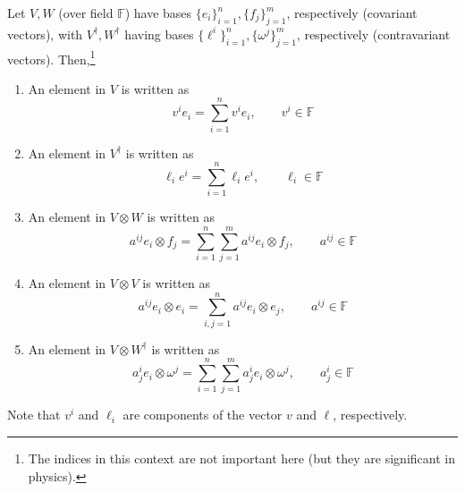	\begin{definition}
	  \label{def:einstein-summation-notation}
 
		Let $V, W$ (over field $\mathbb{F}$) have bases $\{e_i\}_{i = 1}^n, \{f_j\}_{j=1}^m$, respectively (covariant vectors), with $V^\dagger, W^\dagger$ having bases $\{\ell^i\}_{i=1}^n, \{\omega^j\}_{j=1}^m$, respectively (contravariant vectors). Then,\footnote{The indices in this context are not important here (but they are significant in physics).} 
		\begin{enumerate}
		  \item An element in $V$ is written as 
				\begin{equation}
					v^i e_i = \sum_{i=1}^n v^i e_i, \qquad v^i \in \mathbb{F}
				\end{equation}

			\item An element in $V^\dagger$ is written as 
				\begin{equation}
					\ell_i e^i = \sum_{i=1}^n \ell_i e^i, \qquad \ell_i \in \mathbb{F}
				\end{equation}

			\item An element in $V \otimes W$ is written as 
				\begin{equation}
					a^{ij} e_i \otimes f_j = \sum_{i=1}^n \sum_{j=1}^m a^{ij} e_i \otimes f_j, \qquad a^{ij} \in \mathbb{F}
				\end{equation}

			\item An element in $V \otimes V$ is written as 
				\begin{equation}
					a^{ij} e_i \otimes e_i = \sum_{i, j = 1}^n a^{ij} e_i \otimes e_j, \qquad a^{ij} \in \mathbb{F} 
				\end{equation}

			\item An element in $V \otimes W^\dagger$ is written as 
				\begin{equation}
					a^{i}_j e_i \otimes \omega^j = \sum_{i=1}^n \sum_{j=1}^m a^i_j e_i \otimes \omega^j, \qquad a^i_j \in \mathbb{F}
				\end{equation}
		\end{enumerate}

		Note that $v^i$ and $\ell_i$ are components of the vector $v$ and $\ell$, respectively. 
	\end{definition}


